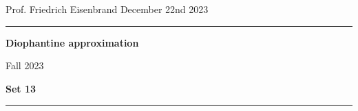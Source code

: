 \documentclass[12pt,a4paper]{article}
\date{}
\theoremstyle{plain}
\newtheorem*{Sol*}{Solution}
\theoremstyle{definition}
\newtheorem{Ex}{Exercise}
\newif\ifsolutions
\newcommand{\exercise}[2]{
			\begin{Ex} #1 \end{Ex}
			\ifsolutions  \begin{Sol*} #2 \end{Sol*} \bigskip \else \bigskip  \fi
		}
\begin{document}
\begin{center}
{Prof. Friedrich Eisenbrand \hfill December 22nd 2023}
\end{center}
	
\hrule\vspace{\baselineskip}

\begin{center}
\textbf{Diophantine approximation}

Fall 2023

\bigskip

\textbf{Set 13}
\ifsolutions{\textbf{- Solutions}} \else{} \fi
\end{center}

\hrule\vspace{\baselineskip}



\end{document}
